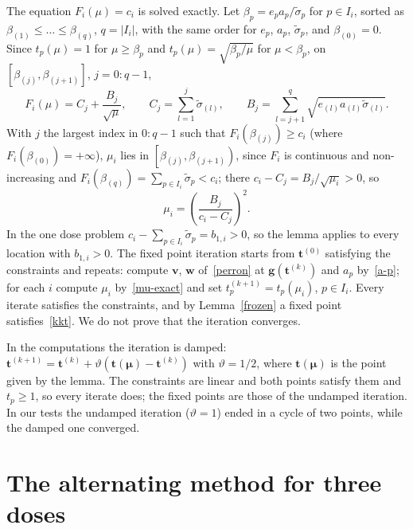 \documentclass[11pt]{article}
\theoremstyle{plain}
\theoremstyle{remark}
\numberwithin{equation}{section}
\begin{document}
The equation $F_i(\mu)=c_i$ is solved exactly. Let
$\beta_p=e_pa_p/\widetilde\sigma_p$ for $p\in I_i$, sorted as
$\beta_{(1)}\le\dots\le\beta_{(q)}$, $q=|I_i|$, with the same order for
$e_p$, $a_p$, $\widetilde\sigma_p$, and $\beta_{(0)}=0$. Since
$t_p(\mu)=1$ for $\mu\ge\beta_p$ and $t_p(\mu)=\sqrt{\beta_p/\mu}$ for
$\mu<\beta_p$, on $\left[\beta_{(j)},\beta_{(j+1)}\right]$, $j=0:q-1$,
\begin{equation}\label{F-piece}
F_i(\mu)=C_j+\frac{B_j}{\sqrt\mu},\qquad
C_j=\sum_{l=1}^{j}\widetilde\sigma_{(l)},\qquad
B_j=\sum_{l=j+1}^{q}\sqrt{e_{(l)}a_{(l)}\widetilde\sigma_{(l)}}.
\end{equation}
With $j$ the largest index in $0:q-1$ such that $F_i\left(\beta_{(j)}\right)\ge c_i$
(where $F_i\left(\beta_{(0)}\right)=+\infty$), $\mu_i$ lies in
$\left[\beta_{(j)},\beta_{(j+1)}\right)$, since $F_i$ is continuous and
non-increasing and $F_i\left(\beta_{(q)}\right)=\sum_{p\in I_i}\widetilde\sigma_p<c_i$; there
$c_i-C_j=B_j/\sqrt{\mu_i}>0$, so
\begin{equation}\label{mu-exact}
\mu_i=\left(\frac{B_j}{c_i-C_j}\right)^2 .
\end{equation}
In the one dose problem $c_i-\sum_{p\in I_i}\widetilde\sigma_p=b_{1,i}>0$,
so the lemma applies to every location with $b_{1,i}>0$. The fixed point
iteration starts from $\bm t^{(0)}$ satisfying the constraints and repeats:
compute $\bm v$, $\bm w$ of~\eqref{perron} at $\bm g\left(\bm t^{(k)}\right)$ and
$a_p$ by~\eqref{a-p}; for each $i$ compute $\mu_i$ by~\eqref{mu-exact} and
set $t^{(k+1)}_p=t_p(\mu_i)$, $p\in I_i$. Every iterate satisfies the
constraints, and by Lemma~\ref{frozen} a fixed point satisfies~\eqref{kkt}.
We do not prove that the iteration converges.

In the computations the iteration is damped:
$\bm t^{(k+1)}=\bm t^{(k)}+\vartheta\left(\bm t(\bm\mu)-\bm t^{(k)}\right)$ with
$\vartheta=1/2$, where $\bm t(\bm\mu)$ is the point given by the lemma. The
constraints are linear and both points satisfy them and $t_p\ge 1$, so every
iterate does; the fixed points are those of the undamped iteration. In our
tests the undamped iteration ($\vartheta=1$) ended in a cycle of two points,
while the damped one converged.

\section{The alternating method for three doses}\label{sec-three}
\end{document}
